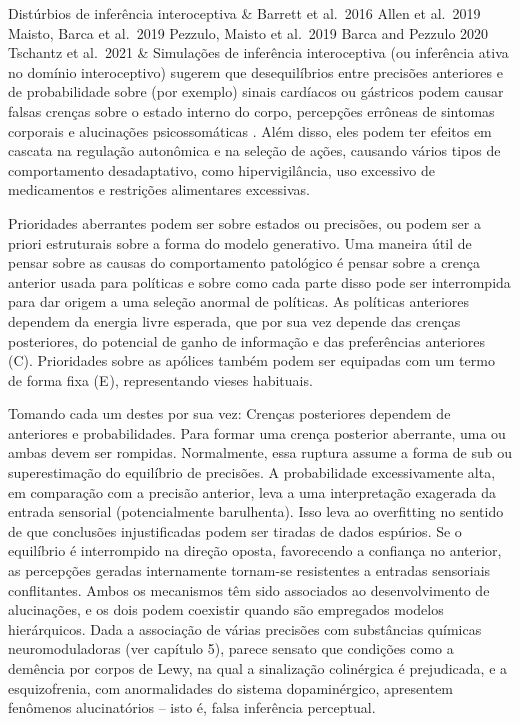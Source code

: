 \documentclass[
  12pt,
]{book}
\begin{document}
\begin{longtable}[]
Distúrbios de inferência interoceptiva & Barrett et al.~2016 Allen et al.~2019 Maisto, Barca et al.~2019 Pezzulo, Maisto et al.~2019 Barca and Pezzulo 2020 Tschantz et al.~2021 & Simulações de inferência interoceptiva (ou inferência ativa no domínio interoceptivo) sugerem que desequilíbrios entre precisões anteriores e de probabilidade sobre (por exemplo) sinais cardíacos ou gástricos podem causar falsas crenças sobre o estado interno do corpo, percepções errôneas de sintomas corporais e alucinações psicossomáticas . Além disso, eles podem ter efeitos em cascata na regulação autonômica e na seleção de ações, causando vários tipos de comportamento desadaptativo, como hipervigilância, uso excessivo de medicamentos e restrições alimentares excessivas. \\
\bottomrule
\end{longtable}

Prioridades aberrantes podem ser sobre estados ou precisões, ou podem ser a priori estruturais sobre a forma do modelo generativo. Uma maneira útil de pensar sobre as causas do comportamento patológico é pensar sobre a crença anterior usada para políticas e sobre como cada parte disso pode ser interrompida para dar origem a uma seleção anormal de políticas. As políticas anteriores dependem da energia livre esperada, que por sua vez depende das crenças posteriores, do potencial de ganho de informação e das preferências anteriores (C). Prioridades sobre as apólices também podem ser equipadas com um termo de forma fixa (E ), representando vieses habituais.

Tomando cada um destes por sua vez: Crenças posteriores dependem de anteriores e probabilidades. Para formar uma crença posterior aberrante, uma ou ambas devem ser rompidas. Normalmente, essa ruptura assume a forma de sub ou superestimação do equilíbrio de precisões. A probabilidade excessivamente alta, em comparação com a precisão anterior, leva a uma interpretação exagerada da entrada sensorial (potencialmente barulhenta). Isso leva ao overfitting no sentido de que conclusões injustificadas podem ser tiradas de dados espúrios. Se o equilíbrio é interrompido na direção oposta, favorecendo a confiança no anterior, as percepções geradas internamente tornam-se resistentes a entradas sensoriais conflitantes. Ambos os mecanismos têm sido associados ao desenvolvimento de alucinações, e os dois podem coexistir quando são empregados modelos hierárquicos. Dada a associação de várias precisões com substâncias químicas neuromoduladoras (ver capítulo 5), parece sensato que condições como a demência por corpos de Lewy, na qual a sinalização colinérgica é prejudicada, e a esquizofrenia, com anormalidades do sistema dopaminérgico, apresentem fenômenos alucinatórios -- isto é, falsa inferência perceptual.
\end{document}
